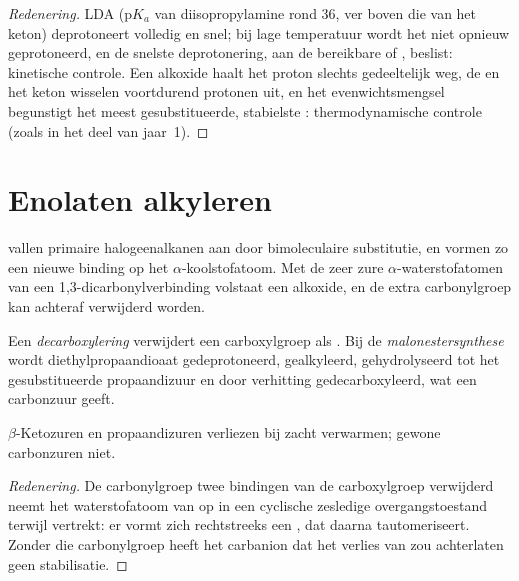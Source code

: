 \begin{proof}[Redenering]
LDA ($\mathrm pK_a$ van diisopropylamine rond 36, ver boven die van het keton) deprotoneert volledig en
snel; bij lage temperatuur wordt het  niet opnieuw geprotoneerd, en de snelste deprotonering, aan de
bereikbare  of , beslist: kinetische controle. Een alkoxide haalt het proton slechts gedeeltelijk weg,
de  en het keton wisselen voortdurend protonen uit, en het evenwichtsmengsel begunstigt het
meest gesubstitueerde, stabielste : thermodynamische controle (zoals in het deel van jaar~1).
\end{proof}

\section{Enolaten alkyleren}

 vallen primaire halogeenalkanen aan door bimoleculaire substitutie, en vormen zo een nieuwe binding  op
het $\alpha$-koolstofatoom. Met de zeer zure $\alpha$-waterstofatomen van een 1,3-dicarbonylverbinding volstaat een alkoxide,
en de extra carbonylgroep kan achteraf verwijderd worden.

\begin{definition}[Decarboxylering]\label{def:b2:enolates-aldol:decarboxylation}
Een \emph{decarboxylering} verwijdert een carboxylgroep als . Bij de
\emph{malonestersynthese} wordt diethylpropaandioaat gedeprotoneerd,
gealkyleerd, gehydrolyseerd tot het gesubstitueerde propaandizuur en door verhitting gedecarboxyleerd, wat een
carbonzuur  geeft.
\end{definition}

\begin{proposition}\label{prop:b2:enolates-aldol:decarboxylation}
$\beta$-Ketozuren en propaandizuren verliezen  bij zacht verwarmen; gewone carbonzuren
niet.
\end{proposition}

\begin{proof}[Redenering]
De carbonylgroep twee bindingen van de carboxylgroep verwijderd neemt het waterstofatoom van  op in een cyclische
zesledige overgangstoestand terwijl  vertrekt: er vormt zich rechtstreeks een , dat daarna tautomeriseert. Zonder
die carbonylgroep heeft het carbanion dat het verlies van  zou achterlaten geen stabilisatie.
\end{proof}


